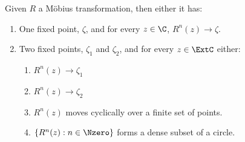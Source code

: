 \begin{theorem}
    Given $R$ a Möbius transformation, then either it has:
    \begin{enumerate}
        \item One fixed point, $\zeta$, and for every $z \in \C$, $R^n(z) \to
        \zeta$.
        \item Two fixed points, $\zeta_1$ and $\zeta_2$, and for every $z \in
        \ExtC$ either:
        \begin{enumerate}
            \item $R^n(z) \to \zeta_1$
            \item $R^n(z) \to \zeta_2$
            \item $R^n(z)$ moves cyclically over a finite set of points.
            \item $\{R^n(z) : n \in \Nzero\}$ forms a dense subset of a circle.
        \end{enumerate}
    \end{enumerate}
\end{theorem}

